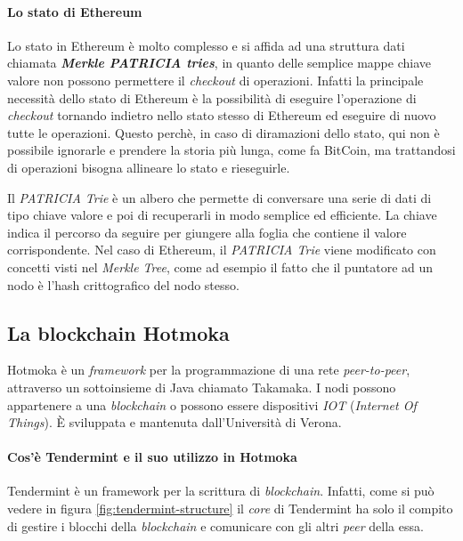 \paragraph{Lo stato di Ethereum}
Lo stato in Ethereum è molto complesso e si affida ad una struttura dati chiamata \textit{\textbf{Merkle PATRICIA tries}}, in quanto delle semplice mappe chiave valore non possono permettere il \textit{checkout} di operazioni. Infatti la principale necessità dello stato di Ethereum è la possibilità di eseguire l'operazione di \textit{checkout} tornando indietro nello stato stesso di Ethereum ed eseguire di nuovo tutte le operazioni. Questo perchè, in caso di diramazioni dello stato, qui non è possibile ignorarle e prendere la storia più lunga, come fa BitCoin, ma trattandosi di operazioni bisogna allineare lo stato e rieseguirle.

Il \textit{PATRICIA Trie} è un albero che permette di conversare una serie di dati di tipo chiave valore e poi di recuperarli in modo semplice ed efficiente. La chiave indica il percorso da seguire per giungere alla foglia che contiene il valore corrispondente. Nel caso di Ethereum, il \textit{PATRICIA Trie} viene modificato con concetti visti nel \textit{Merkle Tree}, come ad esempio il fatto che il puntatore ad un nodo è l'hash crittografico del nodo stesso.


\subsection{La blockchain Hotmoka}
Hotmoka è un \textit{framework} per la programmazione di una rete \textit{peer-to-peer}, attraverso un sottoinsieme di Java chiamato Takamaka. I nodi possono appartenere a una \textit{blockchain} o possono essere dispositivi \textit{IOT} (\textit{Internet Of Things}). È sviluppata e mantenuta dall'Università di Verona.

\paragraph{Cos'è Tendermint e il suo utilizzo in Hotmoka}
Tendermint è un framework per la scrittura di \textit{blockchain}. Infatti, come si può vedere in figura \ref{fig:tendermint-structure} il \textit{core} di Tendermint ha solo il compito di gestire i blocchi della \textit{blockchain} e comunicare con gli altri \textit{peer} della essa.

